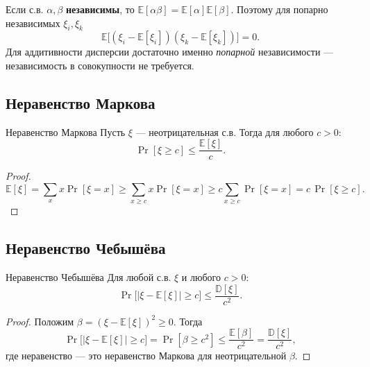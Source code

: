 \begin{Remark}{}{}
	Если с.в. $\alpha,\beta$ \textbf{независимы}, то $\mathbb{E}[\alpha\beta]=\mathbb{E}[\alpha]\mathbb{E}[\beta]$. Поэтому для попарно независимых $\xi_i,\xi_k$
	\[
	\mathbb{E}\bigl[(\xi_i-\mathbb{E}[\xi_i])(\xi_k-\mathbb{E}[\xi_k])\bigr]=0.
	\]
	Для аддитивности дисперсии достаточно именно \emph{попарной} независимости — независимость в совокупности не требуется.
\end{Remark}

\subsection{Неравенство Маркова}

\begin{Theorem}{Неравенство Маркова}{}
	Пусть $\xi$ — неотрицательная с.в. Тогда для любого $c>0$:
	\[
	\Pr[\xi\ge c]\le\frac{\mathbb{E}[\xi]}{c}.
	\]
\end{Theorem}

\begin{proof}
	\[
	\mathbb{E}[\xi]=\sum_{x}x\Pr[\xi=x]\ge\sum_{x\ge c}x\Pr[\xi=x]\ge c\sum_{x\ge c}\Pr[\xi=x]=c\,\Pr[\xi\ge c].
	\]
\end{proof}

\subsection{Неравенство Чебышёва}

\begin{Theorem}{Неравенство Чебышёва}{}
	Для любой с.в. $\xi$ и любого $c>0$:
	\[
	\Pr\bigl[|\xi-\mathbb{E}[\xi]|\ge c\bigr]\le\frac{\mathbb{D}[\xi]}{c^2}.
	\]
\end{Theorem}

\begin{proof}
	Положим $\beta=(\xi-\mathbb{E}[\xi])^2\ge 0$. Тогда
	\[
	\Pr\bigl[|\xi-\mathbb{E}[\xi]|\ge c\bigr]=\Pr[\beta\ge c^2]\le\frac{\mathbb{E}[\beta]}{c^2}=\frac{\mathbb{D}[\xi]}{c^2},
	\]
	где неравенство — это неравенство Маркова для неотрицательной $\beta$.
\end{proof}

